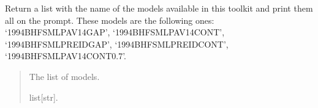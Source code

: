 \documentclass[letterpaper,10pt,english]{sphinxmanual}
\begin{document}
\begin{fulllineitems}
\label{\detokenize{source/api/setup_eos_micro_lp:nucleardatapy.eos.setup_micro_lp.micro_LP_models}}
\pysigstartsignatures
{}
\pysigstopsignatures
\sphinxAtStartPar
Return a list with the name of the models available in this toolkit and     print them all on the prompt. These models are the following ones:     ‘1994\sphinxhyphen{}BHF\sphinxhyphen{}SM\sphinxhyphen{}LP\sphinxhyphen{}AV14\sphinxhyphen{}GAP’, ‘1994\sphinxhyphen{}BHF\sphinxhyphen{}SM\sphinxhyphen{}LP\sphinxhyphen{}AV14\sphinxhyphen{}CONT’,     ‘1994\sphinxhyphen{}BHF\sphinxhyphen{}SM\sphinxhyphen{}LP\sphinxhyphen{}REID\sphinxhyphen{}GAP’, ‘1994\sphinxhyphen{}BHF\sphinxhyphen{}SM\sphinxhyphen{}LP\sphinxhyphen{}REID\sphinxhyphen{}CONT’, ‘1994\sphinxhyphen{}BHF\sphinxhyphen{}SM\sphinxhyphen{}LP\sphinxhyphen{}AV14\sphinxhyphen{}CONT\sphinxhyphen{}0.7’.
\begin{quote}\begin{description}
\sphinxAtStartPar
The list of models.

\sphinxAtStartPar
list{[}str{]}.

\end{description}\end{quote}

\end{fulllineitems}

\end{document}
